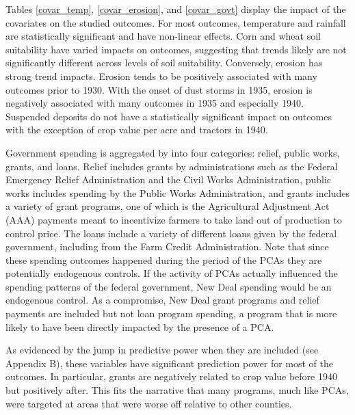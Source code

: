 \documentclass[12pt]{article}
\begin{document}
\begin{appendices}
    Tables \ref{covar_temp}, \ref{covar_erosion}, and \ref{covar_govt} display the impact of the covariates on the studied outcomes.
    For most outcomes, temperature and rainfall are statistically significant and have non-linear effects.
    Corn and wheat soil suitability have varied impacts on outcomes, suggesting that trends likely are not significantly different across levels of soil suitability.
    Conversely, erosion has strong trend impacts.
    Erosion tends to be positively associated with many outcomes prior to 1930.
    With the onset of dust storms in 1935, erosion is negatively associated with many outcomes in 1935 and especially 1940.
    Suspended deposits do not have a statistically significant impact on outcomes with the exception of crop value per acre and tractors in 1940.
    
    Government spending is aggregated by \citet{fishback_can_2003} into four categories: relief, public works, grants, and loans. 
    Relief includes grants by administrations such as the Federal Emergency Relief Administration and the Civil Works Administration, public works includes spending by the Public Works Administration, and grants includes a variety of grant programs, one of which is the Agricultural Adjustment Act (AAA) payments meant to incentivize farmers to take land out of production to control price.
    The loans include a variety of different loans given by the federal government, including from the Farm Credit Administration.
    Note that since these spending outcomes happened during the period of the PCAs they are potentially endogenous controls. 
    If the activity of PCAs actually influenced the spending patterns of the federal government, New Deal spending would be an endogenous control. 
    As a compromise, New Deal grant programs and relief payments are included but not loan program spending, a program that is more likely to have been directly impacted by the presence of a PCA.
    
    As evidenced by the jump in predictive power when they are included (see Appendix B), these variables have significant prediction power for most of the outcomes.
    In particular, grants are negatively related to crop value before 1940 but positively after.
    This fits the narrative that many programs, much like PCAs, were targeted at areas that were worse off relative to other counties.
    

\end{appendices}
\end{document}
